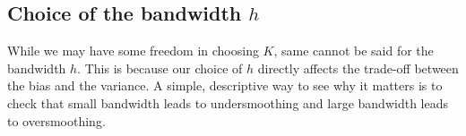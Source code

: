 \documentclass[12pt]{article}
\theoremstyle{definition}
\theoremstyle{property}
\theoremstyle{assumption}
\theoremstyle{example}
\theoremstyle{comment}
\newtheorem{comment}{Comment}[section]
\begin{document}
 \begin{mdframed}[backgroundcolor=yellow!5]

\end{mdframed}
\subsection{Choice of the bandwidth $h$}
While we may have some freedom in choosing $K$, same cannot be said for the bandwidth $h$. This is because our choice of $h$ directly affects the trade-off between the bias and the variance. A simple, descriptive way to see why it matters is to check that small bandwidth leads to undersmoothing and large bandwidth leads to oversmoothing.
\end{document}
